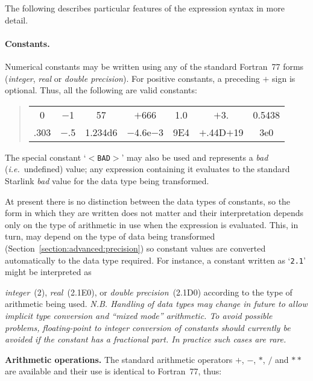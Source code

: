 \documentclass[twoside,nolof,11pt]{starlink}
\begin{document}
The following describes particular features of the expression syntax in more
detail.

\paragraph{Constants.}
Numerical constants may be written using any of the standard Fortran~77
forms (\emph{integer}, \emph{real} or \emph{double precision}).
For positive constants, a preceding $+$ sign is optional.
Thus, all the following are valid constants:

\begin{quote}
\begin{center}
\begin{tabular}{ccccccc}

0 & $-$1 & 57 & $+$666 & 1.0 & $+$3. & 0.5438 \\
.303 & $-$.5 & 1.234d6 & $-$4.6e$-$3 & 9E4 & $+$.44D$+$19 & 3e0\\

\end{tabular}
\end{center}
\end{quote}

The special constant `$<$\verb#BAD#$>$' may also be used and represents a
\emph{bad} (\emph{i.e.}\ undefined) value; any expression containing it
evaluates to the standard Starlink \emph{bad} value for the data type being
transformed.

At present there is no distinction between the data types of constants, so
the form in which they are written does not matter and their interpretation
depends only on the type of arithmetic in use when the expression is
evaluated.
This, in turn, may depend on the type of data being transformed
(Section~\ref{section:advanced:precision}) so constant values are converted
automatically to the data type required.
For instance, a constant written as `\mbox{\texttt{2.1}}' might be interpreted as

\emph{integer}~(2), \emph{real}~(2.1E0), or \emph{double precision}~(2.1D0)
according to the type of arithmetic being used. \emph{N.B. Handling of data types may change in future to allow
  implicit type conversion and ``mixed mode'' arithmetic. To avoid
  possible problems, floating-point to integer conversion of constants
  should currently be avoided if the constant has a fractional part.
  In practice such cases are rare.}


\textbf{Arithmetic operations.}
The standard arithmetic operators $+$, $-$, $*$, $/$ and $**$ are available
and their use is identical to Fortran~77, thus:
\end{document}
